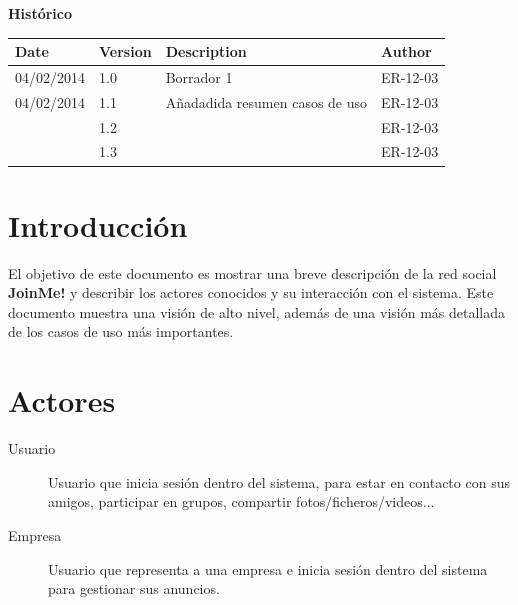 \documentclass[12pt, a4paper, titlepage]{article}
\begin{document}
\begin{titlepage}
\vspace{2cm}
\begin{center}
	\large{\textbf{Histórico}}
	
    \begin{tabular}{ | p{4cm} | p{2cm} | p{5cm} | p{4cm} |}
    \hline
    \textbf{Date} & \textbf{Version} & \textbf{Description} & \textbf{Author} \\ \hline
    04/02/2014 & 1.0 & Borrador 1  & ER-12-03  \\ \hline
     04/02/2014 & 1.1 & Añadadida resumen casos de uso & ER-12-03  \\ \hline
     & 1.2 &  & ER-12-03  \\ \hline
     & 1.3 &  & ER-12-03  \\ \hline
    \end{tabular}
\end{center}

\end{titlepage}
\clearpage


\tableofcontents
\clearpage

\section{Introducción}

El objetivo de este documento es mostrar una breve descripción de la red social \textbf{JoinMe!} y describir los actores conocidos y su interacción con el sistema.
Este documento muestra una visión de alto nivel, además de una visión más detallada de los casos de uso más importantes.

\section{Actores}
\begin{description}

\item [Usuario] Usuario que inicia sesión dentro del sistema, para estar en contacto con sus amigos, participar en grupos, compartir fotos/ficheros/videos...

\item [Empresa] Usuario que representa a una empresa e inicia sesión dentro del sistema para gestionar sus anuncios.

\end{description}
\end{document}
